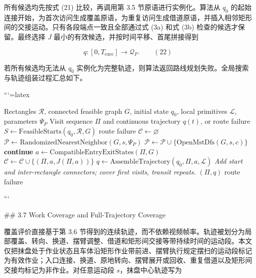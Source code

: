 所有候选均先按式 (21) 比较，再调用第 3.5 节原语进行实例化。算法从 $q_0$ 的起始连接开始，为首次访问生成覆盖原语，为重复访问生成借道原语，并插入相邻矩形间的交接运动。只有各段端点一致且全部通过式 (3a) 和式 (3b) 检查的候选才保留。最终选择 $J$ 最小的有效候选，并按时间平移、首尾拼接得到

$$
q:[0,T_{\mathrm{exec}}]\rightarrow\mathcal Q_F.
\qquad(22)
$$

若所有候选均无法从 $q_0$ 实例化为完整轨迹，则算法返回路线规划失败。全局搜索与轨迹组装过程汇总如下。

```{=latex}
\begin{algorithm}[H]
\caption{Global route planning and trajectory assembly}
\label{alg:global-route}
\small
\begin{algorithmic}[1]
\Require Rectangles $\mathcal R$, connected feasible graph $G$, initial state $q_0$, local primitives $\mathcal L$, parameters $\Psi_P$
\Ensure Visit sequence $\Pi$ and continuous trajectory $q(t)$, or route failure
\State $S\gets\mathrm{FeasibleStarts}(q_0,\mathcal R,G)$
  \State \Return route failure
\EndIf
\State $\mathcal C\gets\varnothing$
  \State $\mathcal P\gets\mathrm{RandomizedNearestNeighbor}(G,s,\Psi_P)$
  \State $\mathcal P\gets\mathcal P\cup\{\mathrm{OpenMstDfs}(G,s,c)\}$ 
      \State \textbf{continue}
    \EndIf
    \State $a\gets\mathrm{CompatibleEntryExitStates}(\Pi,G)$
      \State $\mathcal C\gets\mathcal C\cup\{(\Pi,a,J(\Pi,a))\}$ 
    \EndIf
  \EndFor
\EndFor
{}
  \State $q\gets\mathrm{AssembleTrajectory}(q_0,\Pi,a,\mathcal L)$
  \Statex \hspace{\algorithmicindent}\textit{Add start and inter-rectangle connectors; cover first visits, transit repeats.}
    \State \Return $(\Pi,q)$
  \EndIf
\EndFor
\State \Return route failure
\end{algorithmic}
\end{algorithm}
```


## 3.7 Work Coverage and Full-Trajectory Coverage

  

覆盖评价直接基于第 3.6 节得到的连续轨迹，而不依赖视频帧率。轨迹被划分为局部覆盖、转向、换道、摆臂调整、借道和矩形间交接等带持续时间的运动段。本文仅把抹盘处于作业状态且车体沿矩形作业带前进、摆臂执行规定摆扫的运动段标记为有效作业；入口连接、换道、原地转向、摆臂展开或回收、重复借道以及矩形间交接均标记为非作业。对任意运动段 $s$，抹盘中心轨迹写为

